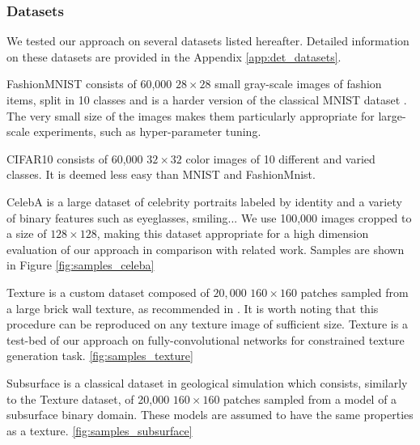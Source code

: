 \subsubsection{Datasets}
We tested our approach on several datasets listed hereafter. Detailed  information on these datasets are provided  in the Appendix \ref{app:det_datasets}.
\begin{description}
	\item{FashionMNIST} \citep{Xiao2017} consists of 60,000 $28\times 28$ small gray-scale images of fashion items, split in 10 classes and is a harder version of the classical MNIST  dataset \citep{LeCun1998a}. %
	The very small size of the images makes them particularly appropriate for large-scale experiments, such as hyper-parameter tuning. 
	
	\item{CIFAR10} \citep{Krizhevsky2009} consists of 60,000 $32 \times 32$ color images of 10 different and varied classes. It is deemed less easy than MNIST and FashionMnist.
	\item{CelebA} \citep{Liu2015} is a large dataset of celebrity portraits labeled by identity and a variety of binary features such as eyeglasses, smiling... We use 100,000 images cropped to a size of $128 \times 128$, making this dataset appropriate for a high dimension evaluation of our approach in comparison with related work. Samples are shown in Figure \ref{fig:samples_celeba}
	
	\item{Texture} is a custom dataset 
	composed of $20,000$ $160 \times 160$ patches sampled from a large brick wall texture, as recommended in \citep{Jetchev2017}. It is worth noting that this procedure can be reproduced on any texture image of sufficient size. Texture is a test-bed of our approach on fully-convolutional networks for constrained texture generation task. \ref{fig:samples_texture}
	
	\item{Subsurface} is a classical dataset in geological simulation \citep{Strebelle2002} which consists, similarly to the Texture dataset, of 20,000  $160 \times 160$ patches sampled from a model of a subsurface binary domain. These models are assumed to have the same properties as a texture.  \ref{fig:samples_subsurface}
	
	
\end{description}

